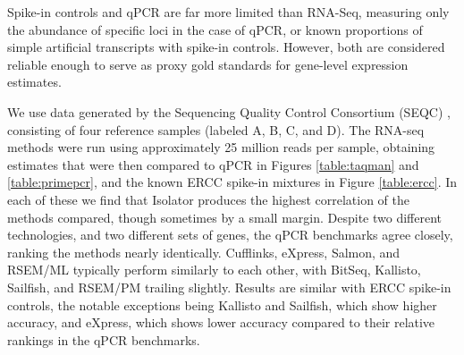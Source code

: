 \documentclass[twocolumn]{article}
\begin{document}
Spike-in controls and qPCR are far more limited than RNA-Seq, measuring
only the abundance of specific loci in the case of qPCR, or known
proportions of simple artificial transcripts with spike-in controls.
However, both are considered reliable enough to serve as proxy gold
standards for gene-level expression estimates.

We use data generated by the Sequencing Quality Control Consortium (SEQC)
\cite{Consortium:2014kc}, consisting of four reference samples (labeled A, B, C,
and D). The RNA-seq methods were run using approximately 25 million reads per
sample, obtaining estimates that were then compared to qPCR in Figures
\ref{table:taqman} and \ref{table:primepcr}, and the known ERCC spike-in
mixtures in Figure \ref{table:ercc}. In each of these we find that Isolator
produces the highest correlation of the methods compared, though sometimes by a
small margin. Despite two different technologies, and two different sets of
genes, the qPCR benchmarks agree closely, ranking the methods nearly
identically. Cufflinks, eXpress, Salmon, and RSEM/ML typically perform similarly
to each other, with BitSeq, Kallisto, Sailfish, and RSEM/PM trailing slightly.
Results are similar with ERCC spike-in controls, the notable exceptions being
Kallisto and Sailfish, which show higher accuracy, and eXpress, which shows
lower accuracy compared to their relative rankings in the qPCR benchmarks.
\end{document}
